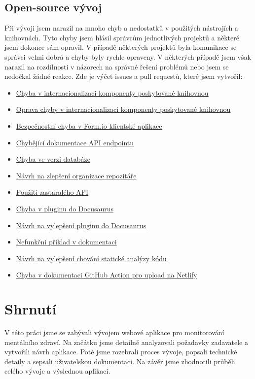 \subsection{Open-source vývoj}\label{subsec:open-source-vyvoj}

Při vývoji jsem narazil na mnoho chyb a nedostatků v použitých nástrojích a knihovnách.
Tyto chyby jsem hlásil správcům jednotlivých projektů a některé jsem dokonce sám opravil.
V případě některých projektů byla komunikace se správci velmi dobrá a chyby byly rychle opraveny.
V některých případě jsem však narazil na rozdílnosti v názorech na správné řešení problémů nebo jsem se nedočkal žádné reakce.
Zde je výčet issues a pull requestů, které jsem vytvořil:

\begin{itemize}
    \item
    \href{https://github.com/formio/react/issues/522}{Chyba v internacionalizaci komponenty poskytované knihovnou}
    \item
    \href{https://github.com/formio/react/pull/538}{Oprava chyby v internacionalizaci komponenty poskytované knihovnou}
    \item
    \href{https://github.com/formio/formio-app-formio/issues/35}{Bezpečnostní chyba v Form.io klientské aplikace}
    \item
    \href{https://github.com/formio/formio/issues/1555}{Chybějící dokumentace API endpointu}
    \item
    \href{https://github.com/formio/formio/issues/1485}{Chyba ve verzi databáze}
    \item
    \href{https://github.com/formio/formio-app-formio/issues/34}{Návrh na zlepšení organizace repozitáře}
    \item
    \href{https://github.com/formio/react/issues/523}{Použití zastaralého API}
    \item
    \href{https://github.com/tgreyuk/typedoc-plugin-markdown/issues/429}{Chyba v pluginu do Docusaurus}
    \item
    \href{https://github.com/tgreyuk/typedoc-plugin-markdown/issues/440}{Návrh na vylepšení pluginu do Docusaurus}
    \item
    \href{https://github.com/react-bootstrap/react-bootstrap/issues/6671}{Nefunkční příklad v dokumentaci}
    \item
    \href{https://github.com/gajus/eslint-plugin-jsdoc/issues/1138}{Návrh na vylepšení chování statické analýzy kódu}
    \item
    \href{https://github.com/MrFlynn/upload-to-netlify-action/issues/17}{Chyba v dokumentaci GitHub Action pro upload na Netlify}
\end{itemize}


\section{Shrnutí}\label{sec:shrnuti}

V této práci jsme se zabývali vývojem webové aplikace pro monitorování mentálního zdraví.
Na začátku jsme detailně analyzovali požadavky zadavatele a vytvořili návrh aplikace.
Poté jsme rozebrali proces vývoje, popsali technické detaily a sepsali uživatelskou dokumentaci.
Na závěr jsme zhodnotili průběh celého vývoje a výslednou aplikaci.